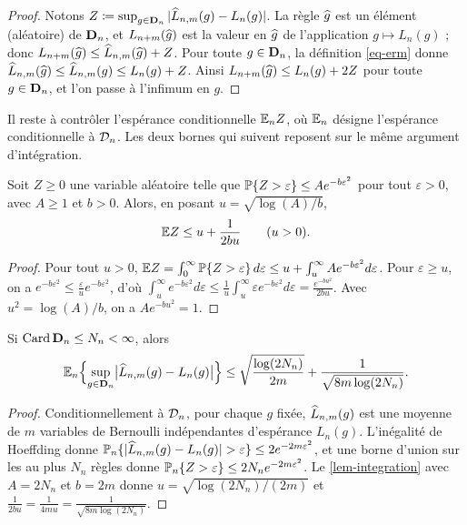 \begin{proof}
Notons $Z\coloneqq\sup_{g\in\mathbf{D}_n}|\widehat{L}_{n,m}(g)-L_n(g)|$. La règle $\widehat{g}$ est un élément (aléatoire) de $\mathbf{D}_n$, et $L_{n+m}(\widehat{g})$ est la valeur en $\widehat{g}$ de l'application $g\mapsto L_n(g)$ ; donc $L_{n+m}(\widehat{g})\le \widehat{L}_{n,m}(\widehat{g})+Z$. Pour toute $g\in\mathbf{D}_n$, la définition \eqref{eq-erm} donne $\widehat{L}_{n,m}(\widehat{g})\le \widehat{L}_{n,m}(g)\le L_n(g)+Z$. Ainsi $L_{n+m}(\widehat{g})\le L_n(g)+2Z$ pour toute $g\in\mathbf{D}_n$, et l'on passe à l'infimum en $g$.
\end{proof}

Il reste à contrôler l'espérance conditionnelle $\mathbb{E}_n Z$, où $\mathbb{E}_n$ désigne l'espérance conditionnelle à $\mathcal{D}_n$. Les deux bornes qui suivent reposent sur le même argument d'intégration.

\begin{lemme}\label{lem-integration}
Soit $Z\ge0$ une variable aléatoire telle que $\mathbb{P}\{Z>\varepsilon\}\le A e^{-b\varepsilon^2}$ pour tout $\varepsilon>0$, avec $A\ge1$ et $b>0$. Alors, en posant $u=\sqrt{\log(A)/b}$,
\[
  \mathbb{E} Z \le u + \frac{1}{2bu} \qquad (u>0).
\]
\end{lemme}

\begin{proof}
Pour tout $u>0$, $\mathbb{E} Z=\int_0^\infty\mathbb{P}\{Z>\varepsilon\}\,d\varepsilon\le u+\int_u^\infty Ae^{-b\varepsilon^2}d\varepsilon$. Pour $\varepsilon\ge u$, on a $e^{-b\varepsilon^2}\le\frac{\varepsilon}{u}e^{-b\varepsilon^2}$, d'où
$\int_u^\infty e^{-b\varepsilon^2}d\varepsilon\le\frac{1}{u}\int_u^\infty\varepsilon e^{-b\varepsilon^2}d\varepsilon=\frac{e^{-bu^2}}{2bu}$. Avec $u^2=\log(A)/b$, on a $Ae^{-bu^2}=1$.
\end{proof}

\begin{proposition}\label{prop-hoeffding}
Si $\operatorname{Card}\mathbf{D}_n\le N_n<\infty$, alors
\[
  \mathbb{E}_n\Bigl\{\sup_{g\in\mathbf{D}_n}\bigl|\widehat{L}_{n,m}(g)-L_n(g)\bigr|\Bigr\}\le\sqrt{\frac{\log(2N_n)}{2m}}+\frac{1}{\sqrt{8m\log(2N_n)}}.
\]
\end{proposition}

\begin{proof}
Conditionnellement à $\mathcal{D}_n$, pour chaque $g$ fixée, $\widehat{L}_{n,m}(g)$ est une moyenne de $m$ variables de Bernoulli indépendantes d'espérance $L_n(g)$. L'inégalité de Hoeffding donne $\PP_n\{|\hL_{n,m}(g)-L_n(g)|>\varepsilon\}\le2e^{-2m\varepsilon^2}$, et une borne d'union sur les au plus $N_n$ règles donne $\mathbb{P}_n\{Z>\varepsilon\}\le2N_ne^{-2m\varepsilon^2}$. Le \cref{lem-integration} avec $A=2N_n$ et $b=2m$ donne $u=\sqrt{\log(2N_n)/(2m)}$ et $\frac{1}{2bu}=\frac{1}{4m u}=\frac{1}{\sqrt{8m\log(2N_n)}}$.
\end{proof}


